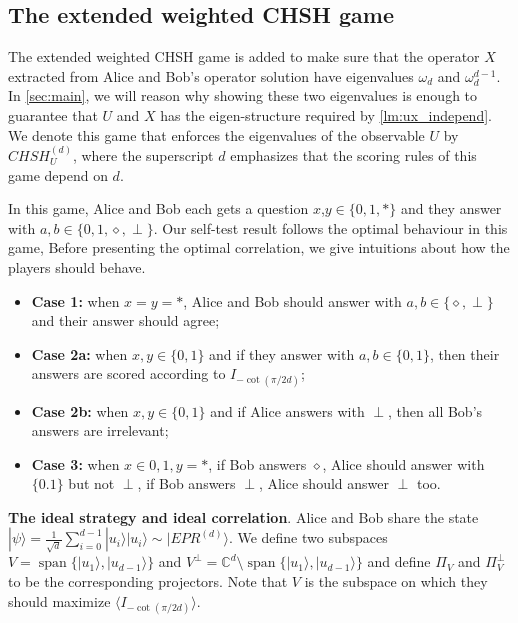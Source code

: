 \documentclass[11pt,letterpaper]{article}
\newcommand{\ket}[1]{|#1\rangle}
\DeclareMathOperator{\spn}{span}
\newcommand{\C}{\mathbb{C}}
\newcommand{\1}{\mathbb{1}}
\newcommand{\CHSH}{CHSH^{(d)}}
\newcommand{\EPR}[1]{EPR^{(#1)}}
\theoremstyle{definition}
\begin{document}
\subsection{The extended weighted CHSH game}
The extended weighted CHSH game is added to make sure that the operator $X$ extracted from 
Alice and Bob's operator solution have eigenvalues $\omega_d$ and $\omega_d^{d-1}$.
In \cref{sec:main}, we will reason why showing these two eigenvalues is enough to guarantee that 
$U$ and $X$ has the eigen-structure required by \cref{lm:ux_independ}.
We denote this game that enforces the eigenvalues of the observable $U$ by
$\CHSH_U$, where the superscript $d$ emphasizes that the scoring rules of this game depend on $d$.


In this game, Alice and Bob each gets a question $x$,$y \in \{ 0, 1, \ast\}$ and 
they answer with $a,b \in \{0,1,\diamond,\perp\}$. 
Our self-test result follows the optimal behaviour in this game,
Before presenting the optimal correlation, we give intuitions about how the players should behave.
\begin{itemize}
	\item \textbf{Case 1:} when $x = y = \ast$, Alice and Bob should answer with $a, b \in \{\diamond, \perp\}$ and 
	their answer should agree;
	\item \textbf{Case 2a:} when $x,y \in \{0,1\}$ and if they answer with $a,b \in \{0,1\}$, then
	their answers are scored according to $I_{-\cot(\pi/2d)}$;
	\item \textbf{Case 2b:} when $x,y \in \{0,1\}$ and if Alice answers with $\perp$, then all Bob's answers are irrelevant;
	\item \textbf{Case 3:} when $x \in {0,1}, y = \ast$, if Bob answers $\diamond$, 
	Alice should answer with $\{0.1\}$ but not $\perp$,
	if Bob answers $\perp$, Alice should answer $\perp$ too.
\end{itemize}
\textbf{The ideal strategy and ideal correlation}. Alice and Bob share the state $\ket{\psi} =\frac{1}{\sqrt{d}} \sum_{i=0}^{d-1} \ket{u_i}\ket{u_i}
\sim \ket{\EPR{d}}$.
We define two subspaces $V = \spn\{\ket{u_1}, \ket{u_{d-1}}\}$ and $V^\perp = \C^d \setminus\spn\{\ket{u_1}, \ket{u_{d-1}}\}$ and
define $\Pi_V$ and $\Pi_{V}^\perp$ to be the corresponding projectors. Note that $V$ is the subspace on which they should
maximize $\langle I_{-\cot(\pi/2d)} \rangle$.
\end{document}
